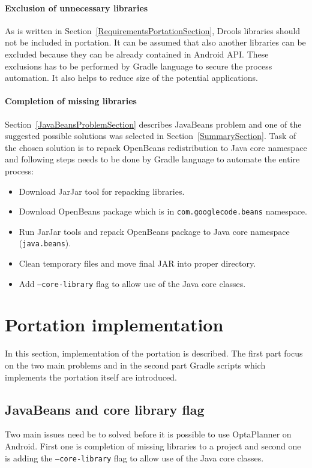 \paragraph{Exclusion of unnecessary libraries}
As is written in Section~\ref{RequirementsPortationSection}, Drools libraries should not be included in portation. It
can be assumed that also another libraries can be excluded because they can be already contained in Android API. These
exclusions has to be performed by Gradle language to secure the process automation. It also helps to reduce size of the
potential applications.

\paragraph{Completion of missing libraries}
Section~\ref{JavaBeansProblemSection} describes JavaBeans problem and one of the suggested possible solutions was
selected in Section~\ref{SummarySection}. Task of the chosen solution is to repack OpenBeans redistribution to Java core
namespace and following steps needs to be done by Gradle language to automate the entire process:
\begin{itemize}
\item Download JarJar tool for repacking libraries.
\item Download OpenBeans package which is in \texttt{com.googlecode.beans} namespace.
\item Run JarJar tools and repack OpenBeans package to Java core namespace (\texttt{java.beans}).
\item Clean temporary files and move final JAR into proper directory.
\item Add \texttt{--core-library} flag to allow use of the Java core classes.
\end{itemize}

\section{Portation implementation}
In this section, implementation of the portation is described. The first part focus on the two main problems and in the
second part Gradle scripts which implements the portation itself are introduced.

\subsection{JavaBeans and core library flag}\label{coreLib}
Two main issues need be to solved before it is possible to use OptaPlanner on Android. First one is completion of
missing libraries to a project and second one is adding the \texttt{--core-library} flag to allow use of the Java core
classes.

